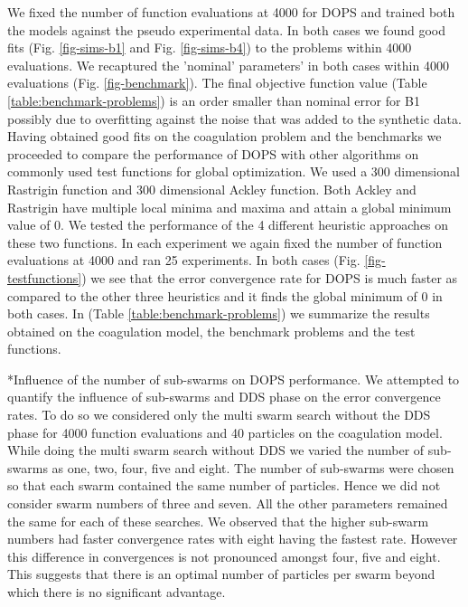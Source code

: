 \documentclass[12pt]{article}
\makeatletter
\renewcommand\subsection{\@startsection
	{subsection}{2}{0mm}
	{-0.05in}
	{-0.5\baselineskip}
	{\normalfont\normalsize\bfseries}}
\makeatother
\begin{document}
We fixed the number of function evaluations at 4000 for DOPS and trained both the models against the pseudo experimental data. In both cases we found good fits  (Fig. \ref{fig-sims-b1} and Fig. \ref{fig-sims-b4}) to the problems within 4000 evaluations. We recaptured the 'nominal' parameters' in both cases within 4000 evaluations (Fig. \ref{fig-benchmark}). The final objective function value (Table \ref{table:benchmark-problems}) is an order smaller than nominal error for B1 possibly due to overfitting against the noise that was added to the synthetic data.
Having obtained good fits on the coagulation problem and the benchmarks we proceeded to compare the performance of DOPS with other algorithms on commonly used test functions for global optimization. We used a 300 dimensional Rastrigin function and 300 dimensional Ackley function. Both Ackley and Rastrigin have multiple local minima and maxima and attain a global minimum value of 0. We tested the performance of the 4 different heuristic approaches on these two functions. In each experiment we again fixed the number of function evaluations at 4000 and ran 25 experiments. In both cases (Fig. \ref{fig-testfunctions}) we see that the error convergence rate for DOPS is much faster as compared to the other three heuristics and it finds the global minimum of 0 in both cases. In (Table \ref{table:benchmark-problems}) we summarize the results obtained on the coagulation model, the benchmark problems and the test functions.

\subsection*{Influence of the number of sub-swarms on DOPS performance.}
We attempted to quantify the influence of sub-swarms and DDS phase on the error convergence rates. To do so we considered only the multi swarm search without the DDS phase for 4000 function evaluations and 40 particles on the coagulation model. While doing the multi swarm search without DDS we varied the number of sub-swarms as one, two, four, five and eight. The number of sub-swarms were chosen so that each swarm contained the same number of particles. Hence we did not consider swarm numbers of three and seven. All the other parameters remained the same for each of these searches. We observed that the higher sub-swarm numbers had faster convergence rates with eight having the fastest rate. However this difference in convergences is not pronounced amongst four, five and eight. This suggests that there is an optimal number of particles per swarm beyond which there is no significant advantage. 
\end{document}
